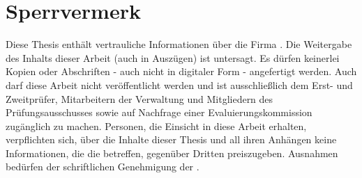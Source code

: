 \section*{Sperrvermerk}

Diese Thesis enthält vertrauliche Informationen über die Firma \koorperationsunternehmen. Die Weitergabe des Inhalts dieser Arbeit (auch in Auszügen) ist untersagt. Es dürfen keinerlei Kopien oder Abschriften - auch nicht in digitaler Form - angefertigt werden. Auch darf diese Arbeit nicht veröffentlicht werden und ist 
ausschließlich dem Erst- und Zweitprüfer, Mitarbeitern der Verwaltung und Mitgliedern des Prüfungsausschusses sowie auf Nachfrage einer Evaluierungskommission zugänglich zu machen. Personen, die Einsicht in diese Arbeit erhalten, verpflichten sich, über die Inhalte dieser Thesis und all ihren Anhängen keine Informationen, die die \koorperationsunternehmen{} betreffen, gegenüber Dritten preiszugeben. Ausnahmen bedürfen der schriftlichen Genehmigung der \koorperationsunternehmen.
\newpage
\fancyhead[R]{\leftmark}